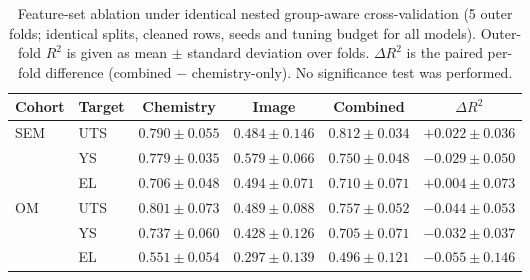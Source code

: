 \begin{table}[t]
\centering
\caption{Feature-set ablation under identical nested group-aware cross-validation
(5 outer folds; identical splits, cleaned rows, seeds and tuning budget for all models).
Outer-fold $R^2$ is given as mean $\pm$ standard deviation over folds.
$\Delta R^2$ is the paired per-fold difference (combined $-$ chemistry-only).
No significance test was performed.}
\label{tab:ablation}
\small
\begin{tabular}{llcccc}
\toprule
Cohort & Target & Chemistry & Image & Combined & $\Delta R^2$ \\
\midrule
SEM & UTS & $0.790 \pm 0.055$ & $0.484 \pm 0.146$ & $0.812 \pm 0.034$ & $+0.022 \pm 0.036$ \\
 & YS & $0.779 \pm 0.035$ & $0.579 \pm 0.066$ & $0.750 \pm 0.048$ & $-0.029 \pm 0.050$ \\
 & EL & $0.706 \pm 0.048$ & $0.494 \pm 0.071$ & $0.710 \pm 0.071$ & $+0.004 \pm 0.073$ \\
\midrule
OM & UTS & $0.801 \pm 0.073$ & $0.489 \pm 0.088$ & $0.757 \pm 0.052$ & $-0.044 \pm 0.053$ \\
 & YS & $0.737 \pm 0.060$ & $0.428 \pm 0.126$ & $0.705 \pm 0.071$ & $-0.032 \pm 0.037$ \\
 & EL & $0.551 \pm 0.054$ & $0.297 \pm 0.139$ & $0.496 \pm 0.121$ & $-0.055 \pm 0.146$ \\
\bottomrule
\end{tabular}
\end{table}
